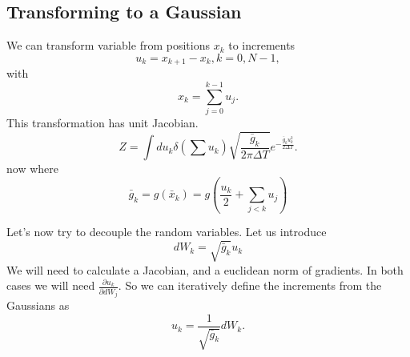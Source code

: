 \subsection{Transforming to a Gaussian}
We can transform variable from positions $x_k$ to increments
\begin{equation}
u_k = x_{k+1} - x_k, k = 0,N-1,
\end{equation}
with
\begin{equation}
x_{k} = \sum_{j=0}^{k-1} u_j.
\end{equation}
This transformation has unit Jacobian.  
\begin{equation}
Z= \int du_k \delta\left(\sum u_k \right)\sqrt{\frac{\bar{g}_k}{2\pi \Delta T}} e^{-\frac{\bar{g}_ku_k^2}{2\Delta T}}.
\end{equation}
now where 
\begin{equation}
\bar{g}_k = g\left(\bar{x}_k\right) =  g\left(\frac{u_k}{2}+\sum_{j<k} u_j\right) 
\end{equation}

Let's now try to decouple the random variables.  Let us introduce 
\begin{equation}
dW_k = \sqrt{\bar{g}_k}u_k
\end{equation}
We will need to calculate a Jacobian, and a euclidean norm of gradients.  In both cases we will need $\frac{\partial u_k}{\partial dW_j}$.  
So we can iteratively define the increments from the Gaussians as 
\begin{equation}
u_k = \frac{1}{\sqrt{\bar{g}_k}}dW_k.
\end{equation}

